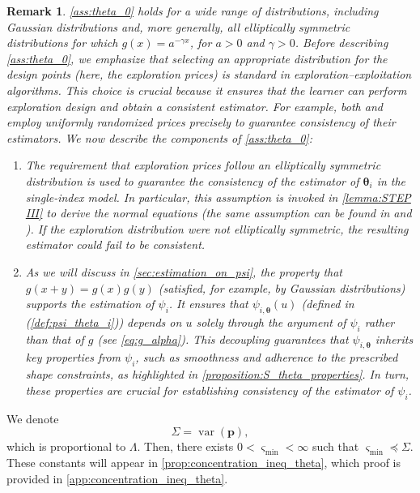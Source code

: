 \documentclass{article} %
\def\eqref#1{equation~\ref{#1}}
\renewcommand{\eqref}[1]{(\ref{#1})}
\newtheorem{remark}[theorem]{Remark}
\begin{document}
\begin{remark}\label{remark:assumption_g}
\cref{ass:theta_0} holds for a wide range of distributions, including Gaussian distributions and, more generally, all elliptically symmetric distributions for which $g(x) = a^{-\gamma x}$, for $a > 0$ and $\gamma > 0$. Before describing \cref{ass:theta_0}, we emphasize that selecting an appropriate distribution for the design points (here, the exploration prices) is standard in exploration–exploitation algorithms. This choice is crucial because it ensures that the learner can perform exploration design and obtain a consistent estimator. For example, both \cite{fan2024policy} and \cite{luo2024distribution} employ uniformly randomized prices precisely to guarantee consistency of their estimators. We now describe the components of \cref{ass:theta_0}:
\begin{enumerate}
\item  The requirement that exploration prices follow an elliptically symmetric distribution is used to guarantee the consistency of the estimator of $\boldsymbol{\theta}_i$ in the single-index model. In particular, this assumption is invoked in \cref{lemma:STEP III} to derive the normal equations (the same assumption can be found in \cite{balabdaoui2019least} and \cite{brillinger2012generalized}). If the exploration distribution were not elliptically symmetric, the resulting estimator could fail to be consistent.

\item As we will discuss in \cref{sec:estimation_on_psi}, the property that $g(x+y)=g(x)g(y)$ (satisfied, for example, by Gaussian distributions) supports the estimation of $\psi_i$. It ensures that $\psi_{i,\boldsymbol{\theta}}(u)$ (defined in \eqref{def:psi_theta_i}) depends on $u$ solely through the argument of $\psi_i$ rather than that of $g$ (see \cref{eq:g_alpha}). This decoupling guarantees that $\psi_{i,\boldsymbol{\theta}}$ inherits key properties from $\psi_i$, such as smoothness and adherence to the prescribed shape constraints, as highlighted in \cref{proposition:S_theta_properties}. In turn, these properties are crucial for establishing consistency of the estimator of $\psi_i$.
\end{enumerate}
\end{remark}

We denote 
$$
\Sigma = \operatorname{var}(\mathbf{p}),
$$
which is proportional to $\Lambda$. Then, there exists $0<\varsigma_{\min} <\infty$ such that $\varsigma_{\min} \preccurlyeq \Sigma$. These constants will appear in \cref{prop:concentration_ineq_theta}, which proof is provided in \cref{app:concentration_ineq_theta}.
\end{document}
